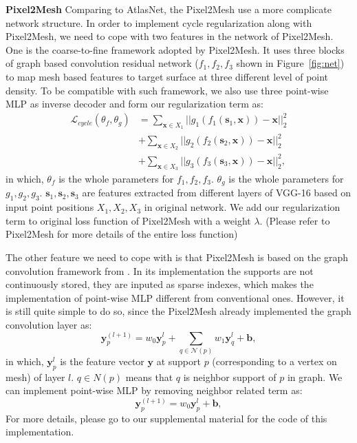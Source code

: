 \noindent\textbf{Pixel2Mesh}
Comparing to AtlasNet, the Pixel2Mesh\cite{pixel2mesh} use a more complicate network structure. In order to implement cycle regularization along with Pixel2Mesh, we need to cope with two features in the network of Pixel2Mesh. 
One is the coarse-to-fine framework adopted by Pixel2Mesh. It uses three blocks of graph based convolution residual network ($f_1,f_2,f_3$ shown in Figure~\ref{fig:net}) to map mesh based features to target surface at three different level of point density. To be compatible with such framework, we also use three point-wise MLP as inverse decoder and form our regularization term as:
\begin{equation}
\begin{aligned}
\mathcal{L}_{cycle}(\theta_f,\theta_g) &= \sum_{\mathbf{x} \in X_1}||g_{1}(f_{1}(\mathbf{s}_1,\mathbf{x})) - \mathbf{x}||_2^2\\
&+ \sum_{\mathbf{x} \in X_2}||g_{2}(f_{2}(\mathbf{s}_2,\mathbf{x})) - \mathbf{x}||_2^2\\
&+ \sum_{\mathbf{x} \in X_3}||g_{3}(f_{3}(\mathbf{s}_3,\mathbf{x})) - \mathbf{x}||_2^2,
\end{aligned}
\end{equation}
in which, $\theta_f$ is the whole parameters for $f_1,f_2,f_3$. $\theta_g$ is the whole parameters for $g_1,g_2,g_3$. $\mathbf{s}_1,\mathbf{s}_2,\mathbf{s}_3$ are features extracted from different layers of VGG-16 based on input point positions $X_1,X_2,X_3$ in original network. We add our regularization term to original loss function of Pixel2Mesh with a weight $\lambda$. (Please refer to Pixel2Mesh\cite{pixel2mesh} for more details of the entire loss function)

The other feature we need to cope with is that Pixel2Mesh is based on the graph convolution framework from \cite{graphconv}. In its implementation the supports are not continuously stored, they are inputed as sparse indexes, which makes the implementation of point-wise MLP different from conventional ones. However, it is still quite simple to do so, since the Pixel2Mesh already implemented the graph convolution layer as:
\begin{equation}
\mathbf{y}_p^{(l+1)} = w_0 \mathbf{y}_p^l + \sum_{q\in\mathcal{N}(p)} w_1\mathbf{y}_q^l + \mathbf{b},
\end{equation}
in which,  $\mathbf{y}_p^l$ is the feature vector $\mathbf{y}$ at support $p$ (corresponding to a vertex on mesh) of layer $l$. $q\in N(p)$ means that $q$ is neighbor support of $p$ in graph. We can implement point-wise MLP by removing neighbor related term as:
\begin{equation}
\mathbf{y}_p^{(l+1)} = w_0 \mathbf{y}_p^l + \mathbf{b},
\end{equation}
For more details, please go to our supplemental material for the code of this implementation.

